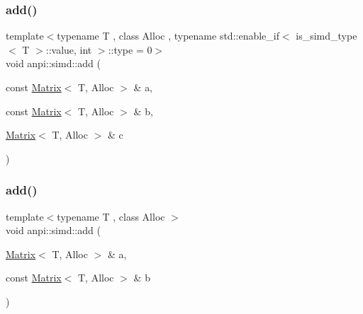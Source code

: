 \subsubsection{\texorpdfstring{add()}{add()}\hspace{0.1cm}{\footnotesize\ttfamily [1/2]}}
{\footnotesize\ttfamily template$<$typename T , class Alloc , typename std\+::enable\+\_\+if$<$ is\+\_\+simd\+\_\+type$<$ T $>$\+::value, int $>$\+::type  = 0$>$ \\
void anpi\+::simd\+::add (\begin{DoxyParamCaption}\item[{const \hyperlink{classanpi_1_1Matrix}{Matrix}$<$ T, Alloc $>$ \&}]{a,  }\item[{const \hyperlink{classanpi_1_1Matrix}{Matrix}$<$ T, Alloc $>$ \&}]{b,  }\item[{\hyperlink{classanpi_1_1Matrix}{Matrix}$<$ T, Alloc $>$ \&}]{c }\end{DoxyParamCaption})\hspace{0.3cm}{\ttfamily [inline]}}

\mbox{\label{namespaceanpi_1_1simd_a254bbb0c28defbf2348e5197607d61bc}} 
\subsubsection{\texorpdfstring{add()}{add()}\hspace{0.1cm}{\footnotesize\ttfamily [2/2]}}
{\footnotesize\ttfamily template$<$typename T , class Alloc $>$ \\
void anpi\+::simd\+::add (\begin{DoxyParamCaption}\item[{\hyperlink{classanpi_1_1Matrix}{Matrix}$<$ T, Alloc $>$ \&}]{a,  }\item[{const \hyperlink{classanpi_1_1Matrix}{Matrix}$<$ T, Alloc $>$ \&}]{b }\end{DoxyParamCaption})\hspace{0.3cm}{\ttfamily [inline]}}

\mbox{\label{namespaceanpi_1_1simd_a68e80d90707dc4526ef25ded81768ad0}} 
